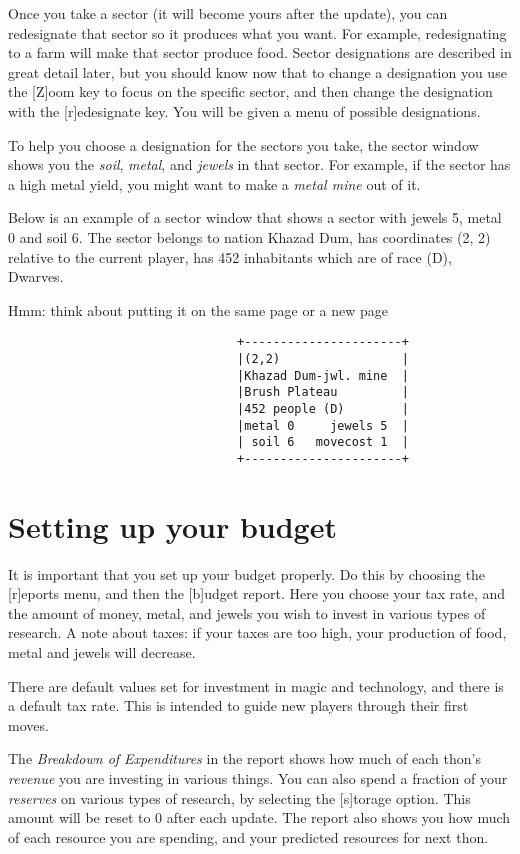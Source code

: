 Once you take a sector (it will become yours after the update), you
can redesignate that sector so it produces what you want.  For
example, redesignating to a farm will make that sector produce food.
Sector designations are described in great detail later, but you
should know now that to change a designation you use the [Z]oom key to
focus on the specific sector, and then change the designation with the
[r]edesignate key.  You will be given a menu of possible designations.

To help you choose a designation for the sectors you take, the sector
window shows you the {\em soil}, {\em metal}, and
{\em jewels} in that sector.  For example, if the sector has a
high metal yield, you might want to make a {\em metal mine} out of
it.

Below is an example of a sector window that shows a sector with jewels
5, metal 0 and soil 6.  The sector belongs to nation Khazad Dum, has
coordinates (2, 2) relative to the current player, has 452 inhabitants
which are of race (D), Dwarves.

\comment Hmm:  think about putting it on the same page or a new page
\comment \newpage
\begin{verbatim}
                                +----------------------+
                                |(2,2)                 |
                                |Khazad Dum-jwl. mine  |
                                |Brush Plateau         |
                                |452 people (D)        |
                                |metal 0     jewels 5  |
                                | soil 6   movecost 1  |
                                +----------------------+
\end{verbatim}

\section{Setting up your budget}
It is important that you set up your budget properly. Do this by
choosing the [r]eports menu, and then the [b]udget report.  Here
you choose your tax rate, and the amount of money, metal, and
jewels you wish to invest in various types of research.  A note
about taxes: if your taxes are too high, your production of food,
metal and jewels will decrease.

There are default values set for investment in magic and technology,
and there is a default tax rate.  This is intended to guide new
players through their first moves.

The {\em Breakdown of Expenditures} in the report shows how much of
each thon's {\em revenue} you are investing in various things.  You
can also spend a fraction of your {\em reserves} on various types of
research, by selecting the [s]torage option. This amount will be reset
to 0 after each update. The report also shows you how much of each
resource you are spending, and your predicted resources for next thon.

